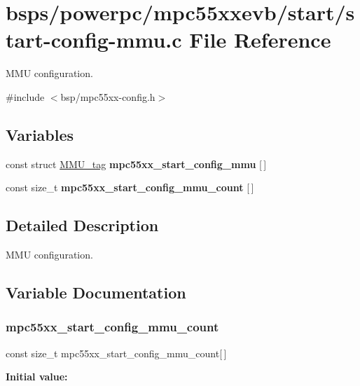 \hypertarget{start-config-mmu_8c}{}\section{bsps/powerpc/mpc55xxevb/start/start-\/config-\/mmu.c File Reference}
\label{start-config-mmu_8c}


M\+MU configuration.  


{\ttfamily \#include $<$bsp/mpc55xx-\/config.\+h$>$}\newline
\subsection*{Variables}
\begin{DoxyCompactItemize}
\item 
\mbox{\label{start-config-mmu_8c_a61ecf69202c1df1cd400423217f3661d}} 
const struct \mbox{\hyperlink{structMMU__tag}{M\+M\+U\+\_\+tag}} {\bfseries mpc55xx\+\_\+start\+\_\+config\+\_\+mmu} \mbox{[}$\,$\mbox{]}
\item 
const size\+\_\+t {\bfseries mpc55xx\+\_\+start\+\_\+config\+\_\+mmu\+\_\+count} \mbox{[}$\,$\mbox{]}
\end{DoxyCompactItemize}


\subsection{Detailed Description}
M\+MU configuration. 



\subsection{Variable Documentation}
\mbox{\label{start-config-mmu_8c_aba7ce1b40683c76b0f8e29d159570a42}} 
\subsubsection{\texorpdfstring{mpc55xx\_start\_config\_mmu\_count}{mpc55xx\_start\_config\_mmu\_count}}
{\footnotesize\ttfamily const size\+\_\+t mpc55xx\+\_\+start\+\_\+config\+\_\+mmu\+\_\+count\mbox{[}$\,$\mbox{]}}

{\bfseries Initial value\+:}
\begin{DoxyCode}{0}
\DoxyCodeLine{= \{}
\DoxyCodeLine{}
\DoxyCodeLine{\}}

\end{DoxyCode}
